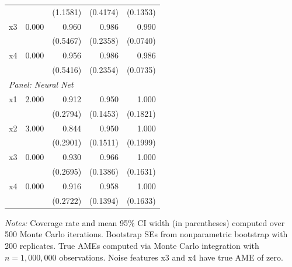 \documentclass[12pt]{article}
\begin{document}
\begin{table}[htbp]
\begin{threeparttable}
\begin{tabular}{lrrrr}
				&  & (1.1581) & (0.4174) & (0.1353) \\
				\quad x3 & 0.000 & 0.960 & 0.986 & 0.990 \\
				&  & (0.5467) & (0.2358) & (0.0740) \\
				\quad x4 & 0.000 & 0.956 & 0.986 & 0.986 \\
				&  & (0.5416) & (0.2354) & (0.0735) \\
				\midrule
				\multicolumn{5}{l}{\textit{Panel: Neural Net}} \\
				\quad x1 & 2.000 & 0.912 & 0.950 & 1.000 \\
				&  & (0.2794) & (0.1453) & (0.1821) \\
				\quad x2 & 3.000 & 0.844 & 0.950 & 1.000 \\
				&  & (0.2901) & (0.1511) & (0.1999) \\
				\quad x3 & 0.000 & 0.930 & 0.966 & 1.000 \\
				&  & (0.2695) & (0.1386) & (0.1631) \\
				\quad x4 & 0.000 & 0.916 & 0.958 & 1.000 \\
				&  & (0.2722) & (0.1394) & (0.1633) \\
				\bottomrule
			\end{tabular}
			\begin{tablenotes}
				\footnotesize
				\item \textit{Notes:} Coverage rate and mean 95\% CI width (in parentheses) computed over 500 Monte Carlo iterations. Bootstrap SEs from nonparametric bootstrap with 200 replicates. True AMEs computed via Monte Carlo integration with $n=1{,}000{,}000$ observations. Noise features x3 and x4 have true AME of zero.
			\end{tablenotes}
		\end{threeparttable}
	\end{table}
	
\end{document}
